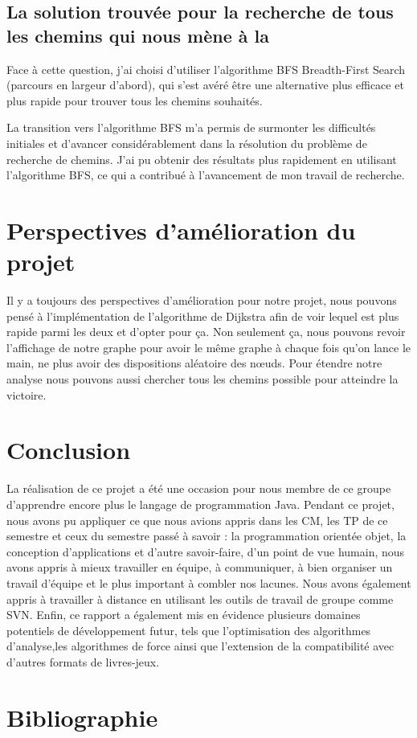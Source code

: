 \documentclass[12pt]{article}
\begin{document}
\subsection{La solution trouvée pour la recherche de tous les chemins qui nous mène à la }
Face à cette question, j'ai choisi d'utiliser l'algorithme BFS Breadth-First Search (parcours en largeur d'abord), qui s'est avéré être une alternative plus efficace et plus rapide pour trouver tous les chemins souhaités.

La transition vers l'algorithme BFS m'a permis de surmonter les difficultés initiales et d'avancer considérablement dans la résolution du problème de recherche de chemins.
J'ai pu obtenir des résultats plus rapidement en utilisant l'algorithme BFS, ce qui a contribué à l'avancement de mon travail de recherche.


\section{Perspectives d'amélioration du projet}
    Il y a toujours des perspectives d’amélioration pour notre projet, nous pouvons pensé à l'implémentation de l'algorithme de Dijkstra afin de voir lequel est plus rapide parmi les deux et d'opter pour ça. Non seulement ça, nous pouvons revoir l'affichage de notre graphe pour avoir le même graphe à chaque fois qu'on lance le main, ne plus avoir des dispositions aléatoire des nœuds. Pour étendre notre analyse nous pouvons aussi chercher tous les chemins possible pour atteindre la victoire.
	

\section{Conclusion}
La réalisation de ce projet a été une occasion pour nous membre de ce groupe d'apprendre
encore plus le langage de programmation Java. Pendant ce projet, nous avons pu appliquer ce
que nous avions appris dans les CM, les TP de ce semestre et ceux du semestre passé à savoir :
la programmation orientée objet, la conception d'applications et d'autre savoir-faire,
d'un point de vue humain, nous avons appris à mieux travailler en équipe, à communiquer,
à bien organiser un travail d'équipe et le plus important à combler nos lacunes. Nous avons
également appris à travailler à distance en utilisant les outils de travail de groupe comme SVN.
Enfin, ce rapport a également mis en évidence plusieurs domaines potentiels de développement futur, tels que l'optimisation des algorithmes d'analyse,les algorithmes de force ainsi que l'extension de la compatibilité avec d'autres formats de livres-jeux.


\section{Bibliographie}
\nocite{*}
 

\end{document}

